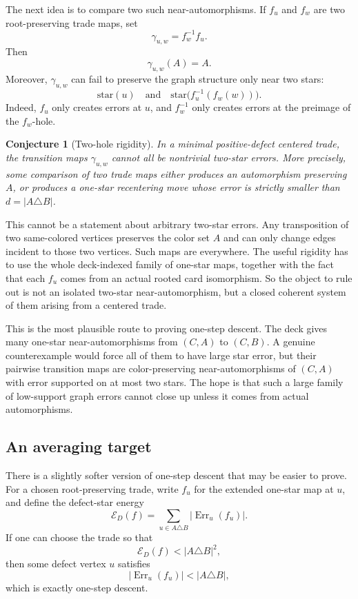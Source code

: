 \documentclass[11pt]{article}
\newtheorem{conjecture}{Conjecture}
\newcommand{\Err}{\operatorname{Err}}
\begin{document}
The next idea is to compare two such near-automorphisms.  If \(f_u\) and
\(f_w\) are two root-preserving trade maps, set
\[
  \gamma_{u,w}=f_w^{-1}f_u.
\]
Then
\[
  \gamma_{u,w}(A)=A.
\]
Moreover, \(\gamma_{u,w}\) can fail to preserve the graph structure only near
two stars:
\[
  \text{star}(u)
  \quad\text{and}\quad
  \text{star}\bigl(f_u^{-1}(f_w(w))\bigr).
\]
Indeed, \(f_u\) only creates errors at \(u\), and \(f_w^{-1}\) only creates
errors at the preimage of the \(f_w\)-hole.

\begin{conjecture}[Two-hole rigidity]
In a minimal positive-defect centered trade, the transition maps
\(\gamma_{u,w}\) cannot all be nontrivial two-star errors.  More precisely,
some comparison of two trade maps either produces an automorphism preserving
\(A\), or produces a one-star recentering move whose error is strictly smaller
than \(d=|A\triangle B|\).
\end{conjecture}

This cannot be a statement about arbitrary two-star errors.  Any transposition
of two same-colored vertices preserves the color set \(A\) and can only change
edges incident to those two vertices.  Such maps are everywhere.  The useful
rigidity has to use the whole deck-indexed family of one-star maps, together
with the fact that each \(f_u\) comes from an actual rooted card isomorphism.
So the object to rule out is not an isolated two-star near-automorphism, but a
closed coherent system of them arising from a centered trade.

This is the most plausible route to proving one-step descent.  The deck gives
many one-star near-automorphisms from \((C,A)\) to \((C,B)\).  A genuine
counterexample would force all of them to have large star error, but their
pairwise transition maps are color-preserving near-automorphisms of
\((C,A)\) with error supported on at most two stars.  The hope is that such a
large family of low-support graph errors cannot close up unless it comes from
actual automorphisms.

\subsection{An averaging target}

There is a slightly softer version of one-step descent that may be easier to
prove.  For a chosen root-preserving trade, write \(f_u\) for the extended
one-star map at \(u\), and define the defect-star energy
\[
  \mathcal E_D(f)
  =
  \sum_{u\in A\triangle B} |\Err_u(f_u)|.
\]
If one can choose the trade so that
\[
  \mathcal E_D(f) < |A\triangle B|^2,
\]
then some defect vertex \(u\) satisfies
\[
  |\Err_u(f_u)| < |A\triangle B|,
\]
which is exactly one-step descent.
\end{document}
